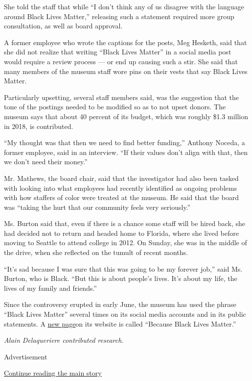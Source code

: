 She told the staff that while ``I don't think any of us disagree with
the language around Black Lives Matter,'' releasing such a statement
required more group consultation, as well as board approval.

A former employee who wrote the captions for the posts, Meg Hesketh,
said that she did not realize that writing ``Black Lives Matter'' in a
social media post would require a review process --- or end up causing
such a stir. She said that many members of the museum staff wore pins on
their vests that say Black Lives Matter.

Particularly upsetting, several staff members said, was the suggestion
that the tone of the postings needed to be modified so as to not upset
donors. The museum says that about 40 percent of its budget, which was
roughly \$1.3 million in 2018, is contributed.

``My thought was that then we need to find better funding,'' Anthony
Noceda, a former employee, said in an interview. ``If their values don't
align with that, then we don't need their money.''

Mr. Mathews, the board chair, said that the investigator had also been
tasked with looking into what employees had recently identified as
ongoing problems with how staffers of color were treated at the museum.
He said that the board was ``taking the hurt that our community feels
very seriously.''

Ms. Burton said that, even if there is a chance some staff will be hired
back, she had decided not to return and headed home to Florida, where
she lived before moving to Seattle to attend college in 2012. On Sunday,
she was in the middle of the drive, when she reflected on the tumult of
recent months.

``It's sad because I was sure that this was going to be my forever
job,'' said Ms. Burton, who is Black. ``But this is about people's
lives. It's about my life, the lives of my family and friends.''

Since the controversy erupted in early June, the museum has used the
phrase ``Black Lives Matter'' several times on its social media accounts
and in its public statements. A
\href{https://thechildrensmuseum.org/black-lives-matter/}{new page}on
its website is called ``Because Black Lives Matter.''

\emph{Alain Delaqueriere contributed research.}

Advertisement

\protect\hyperlink{after-bottom}{Continue reading the main story}

